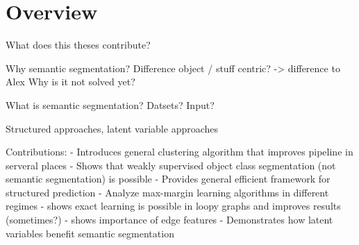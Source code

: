 \section{Overview}
What does this theses contribute?

Why semantic segmentation? Difference object / stuff centric? -> difference to Alex
Why is it not solved yet?

What is semantic segmentation?
Datsets? Input?

Structured approaches, latent variable approaches

Contributions:
- Introduces general clustering algorithm that improves pipeline in serveral places
- Shows that weakly supervised object class segmentation (not semantic segmentation) is possible
- Provides general efficient framework for structured prediction
- Analyze max-margin learning algorithms in different regimes
- shows exact learning is possible in loopy graphs and improves results (sometimes?)
- shows importance of edge features
- Demonstrates how latent variables benefit semantic segmentation
